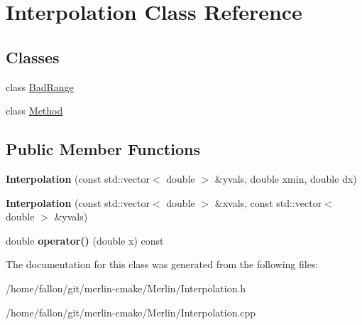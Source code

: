 \hypertarget{classInterpolation}{}\section{Interpolation Class Reference}
\label{classInterpolation}
\subsection*{Classes}
\begin{DoxyCompactItemize}
\item 
class \hyperlink{classInterpolation_1_1BadRange}{Bad\+Range}
\item 
class \hyperlink{classInterpolation_1_1Method}{Method}
\end{DoxyCompactItemize}
\subsection*{Public Member Functions}
\begin{DoxyCompactItemize}
\item 
\mbox{\label{classInterpolation_aa9622506183eb8156a26df6adf6a832a}} 
{\bfseries Interpolation} (const std\+::vector$<$ double $>$ \&yvals, double xmin, double dx)
\item 
\mbox{\label{classInterpolation_af2e464628655aef69bee97db4b1604f8}} 
{\bfseries Interpolation} (const std\+::vector$<$ double $>$ \&xvals, const std\+::vector$<$ double $>$ \&yvals)
\item 
\mbox{\label{classInterpolation_a227b538026a9742388faa4a041c15435}} 
double {\bfseries operator()} (double x) const
\end{DoxyCompactItemize}


The documentation for this class was generated from the following files\+:\begin{DoxyCompactItemize}
\item 
/home/fallon/git/merlin-\/cmake/\+Merlin/Interpolation.\+h\item 
/home/fallon/git/merlin-\/cmake/\+Merlin/Interpolation.\+cpp\end{DoxyCompactItemize}

